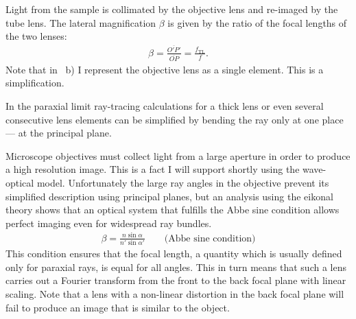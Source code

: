 

Light from the sample is collimated by the objective lens and
 re-imaged by the tube lens. The lateral
magnification $\beta$ is given by the ratio of the focal lengths of
the two lenses:
\begin{align}
  \beta=\frac{\overline{O'P'}}{\overline{OP}}=\frac{f_\mathrm{TL}}{f}.
\end{align}
Note that in ~b) I represent the
 objective lens as a single element.  This
is a simplification.

In the paraxial limit ray-tracing calculations for a thick lens or
even several consecutive lens elements can be simplified by bending
the ray only at one place --- at the principal plane.





Microscope objectives must collect light from a large aperture in
order to produce a high resolution image. This is a fact I will
support shortly using the wave-optical model. Unfortunately the large
ray angles in the objective prevent its simplified description using
principal planes, but an analysis using the eikonal theory shows that
an optical system that fulfills the Abbe sine condition allows perfect
imaging even for widespread ray bundles.
\begin{align}
  \label{eq:sine-condition}
  \beta = \frac{n \sin\alpha}{n' \sin\alpha'} \qquad \textrm{(Abbe sine condition)}
\end{align}
This condition ensures that the focal length, a quantity which is
usually defined only for paraxial rays, is equal for all angles.  This
in turn means that such a lens carries out a Fourier transform from
the front to the back focal plane with linear scaling. Note that a
lens with a non-linear distortion in the back focal plane will fail to
produce an image that is similar to the object.

